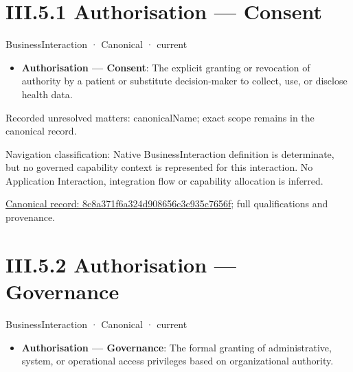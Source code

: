 \section*{III.5.1 Authorisation — Consent}
\label{navigation:III.5.1}

\label{element:8c8a371f6a324d908656c3c935c7656f}
{\small BusinessInteraction · Canonical · current}\par

\begin{itemize}


\item \textbf{Authorisation — Consent}: The explicit granting or revocation of authority by a patient or substitute decision-maker to collect, use, or disclose health data.

\end{itemize}

{\small Recorded unresolved matters: canonicalName; exact scope remains in the canonical record.}\par
{\small Navigation classification: Native BusinessInteraction definition is determinate, but no governed capability context is represented for this interaction. No Application Interaction, integration flow or capability allocation is inferred.}\par
{\footnotesize \href{../../../../continuum/business/business-interaction/8c8a371f6a324d908656c3c935c7656f.md}{Canonical record: 8c8a371f6a324d908656c3c935c7656f}; full qualifications and provenance.}\par
\section*{III.5.2 Authorisation — Governance}
\label{navigation:III.5.2}

\label{element:a1a6a8eeb4d54fa9ac184198a506d318}
{\small BusinessInteraction · Canonical · current}\par

\begin{itemize}


\item \textbf{Authorisation — Governance}: The formal granting of administrative, system, or operational access privileges based on organizational authority.

\end{itemize}

